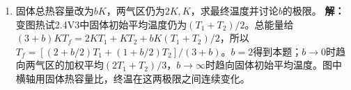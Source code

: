 \documentclass[UTF8,fontset=fandol,a4paper,11pt]{ctexart}
\begin{document}
\begin{enumerate}
\item 固体总热容量改为$bK$，两气区仍为$2K,K$，求最终温度并讨论$b$的极限。
\textbf{解：}变图热试2.4V3中固体初始平均温度仍为$(T_1+T_2)/2$。总能量给$(3+b)KT_f=2KT_1+KT_2+bK(T_1+T_2)/2$，所以$T_f=[(2+b/2)T_1+(1+b/2)T_2]/(3+b)$。$b=2$得到本题；$b\to0$时趋向两气区的加权平均$(2T_1+T_2)/3$，$b\to\infty$时趋向固体初始平均温度。图中横轴用固体热容量比，终温在这两极限之间连续变化。
\begin{center}\begin{minipage}{.98\linewidth}\centering
{}
\end{minipage}
\end{center}
\end{enumerate}
\end{document}
